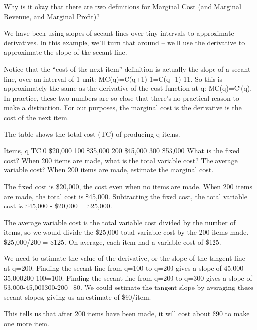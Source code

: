 Why is it okay that there are two definitions for Marginal Cost (and Marginal Revenue, and Marginal Profit)?

We have been using slopes of secant lines over tiny intervals to approximate derivatives. In this example, we’ll turn that around – we’ll use the derivative to approximate the slope of the secant line.

Notice that the “cost of the next item” definition is actually the slope of a secant line, over an interval of 1 unit:
MC(q)=C(q+1)-1=C(q+1)-11.
So this is approximately the same as the derivative of the cost function at q:
MC(q)=C′(q).
In practice, these two numbers are so close that there’s no practical reason to make a distinction. For our purposes, the marginal cost is the derivative is the cost of the next item.

\begin{example}
The table shows the total cost (TC) of producing q items.

Items, q	TC	0	\$20,000	100	\$35,000	200	\$45,000	300	\$53,000
What is the fixed cost?
When 200 items are made, what is the total variable cost? The average variable cost?
When 200 items are made, estimate the marginal cost.

\begin{solution}
  The fixed cost is \$20,000, the cost even when no items are made.
When 200 items are made, the total cost is \$45,000. Subtracting the fixed cost, the total variable cost is \$45,000 - \$20,000 = \$25,000.

The average variable cost is the total variable cost divided by the number of items, so we would divide the \$25,000 total variable cost by the 200 items made. \$25,000/200 = \$125. On average, each item had a variable cost of \$125.

We need to estimate the value of the derivative, or the slope of the tangent line at q=200. Finding the secant line from q=100 to q=200 gives a slope of
45,000-35,000200-100=100.
Finding the secant line from q=200 to q=300 gives a slope of
53,000-45,000300-200=80.
We could estimate the tangent slope by averaging these secant slopes, giving us an estimate of \$90/item.

This tells us that after 200 items have been made, it will cost about \$90 to make one more item.
\end{solution}\end{example}
